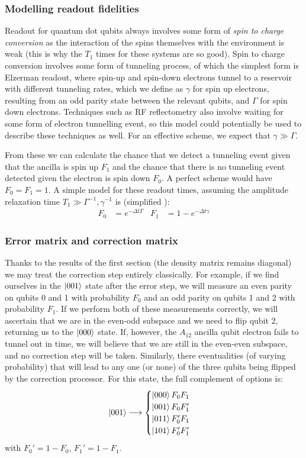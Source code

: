 \documentclass{report}
\begin{document}
\begin{appendices}
\subsubsection{Modelling readout fidelities}
Readout for quantum dot qubits always involves some form of \textit{spin to charge conversion} as the interaction of the spins themselves with the environment is weak (this is why the $T_1$ times for these systems are so good). Spin to charge conversion involves some form of tunneling process, of which the simplest form is Elzerman readout, where spin-up and spin-down electrons tunnel to a reservoir with different tunneling rates, which we define as $\gamma$ for spin up electrons, resulting from an odd parity state between the relevant qubits, and $\Gamma$ for spin down electrons. Techniques such as RF reflectometry also involve waiting for some form of electron tunnelling event, so this model could potentially be used to describe these techniques as well. For an effective scheme, we expect that $\gamma \gg \Gamma$.

From these we can calculate the chance that we detect a tunneling event given that the ancilla is spin up $F_1$ and the chance that there is no tunneling event detected given the electron is spin down $F_0$. A perfect scheme would have $F_0 = F_1 = 1$. A simple model for these readout times, assuming the amplitude relaxation time $T_1 \gg \Gamma^{-1}, \gamma^{-1}$ is (simplified \cite{Keith2019}):
\begin{align*}
    F_0 &= e^{-\Delta t \Gamma} & F_1 &= 1-e^{-\Delta t \gamma}
\end{align*}
\subsubsection{Error matrix and correction matrix}
Thanks to the results of the first section (the density matrix remains diagonal) we may treat the correction step entirely classically. For example, if we find ourselves in the $\ket{001}$ state after the error step, we will measure an even parity on qubits 0 and 1 with probability $F_0$ and an odd parity on qubits 1 and 2 with probability $F_1$. If we perform both of these measurements correctly, we will ascertain that we are in the even-odd subspace and we need to flip qubit 2, returning us to the $\ket{000}$ state. If, however, the $A_{12}$ ancilla qubit electron fails to tunnel out in time, we will believe that we are still in the even-even subspace, and no correction step will be taken. Similarly, there eventualities (of varying probability) that will lead to any one (or none) of the three qubits being flipped by the correction processor. For this state, the full complement of options is:
\begin{equation*}
\ket{001} \longrightarrow 
\begin{cases} 
      \ket{000} F_0 F_1 \\
      \ket{001} F_0 F_1' \\
      \ket{011} F_0' F_1 \\
      \ket{101} F_0' F_1'
   \end{cases}
\end{equation*}
with $F_0' = 1-F_0$, $F_1' = 1-F_1$.


\end{appendices}
\end{document}
